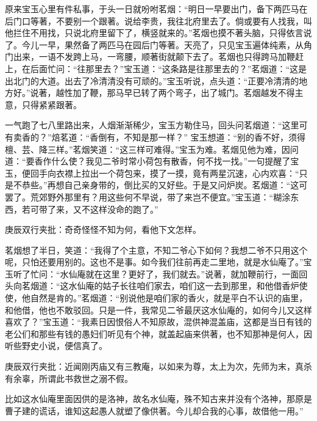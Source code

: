 \begin{parag}
    原来宝玉心里有件私事，于头一日就吩咐茗烟：“明日一早要出门，备下两匹马在后门口等著，不要别一个跟著。说给李贵，我往北府里去了。倘或要有人找我，叫他拦住不用找，只说北府里留下了，横竖就来的。”茗烟也摸不著头脑，只得依言说了。今儿一早，果然备了两匹马在园后门等著。天亮了，只见宝玉遍体纯素，从角门出来，一语不发跨上马，一弯腰，顺著街就颠下去了。茗烟也只得跨马加鞭赶上，在后面忙问：“往那里去？”宝玉道：“这条路是往那里去的？”茗烟道：“这是出北门的大道。出去了冷清清没有可顽的。”宝玉听说，点头道：“正要冷清清的地方好。”说著，越性加了鞭，那马早已转了两个弯子，出了城门。茗烟越发不得主意，只得紧紧跟著。
\end{parag}


\begin{parag}
    一气跑了七八里路出来，人烟渐渐稀少，宝玉方勒住马，回头问茗烟道：“这里可有卖香的？”焙茗道：“香倒有，不知是那一样？” 宝玉想道：“别的香不好，须得檀、芸、降三样。”茗烟笑道：“这三样可难得。”宝玉为难。茗烟见他为难，因问道：“要香作什么使？我见二爷时常小荷包有散香，何不找一找。”一句提醒了宝玉，便回手向衣襟上拉出一个荷包来，摸了一摸，竟有两星沉速，心内欢喜：“只是不恭些。”再想自己亲身带的，倒比买的又好些。于是又问炉炭。茗烟道：“这可罢了。荒郊野外那里有？用这些何不早说，带了来岂不便宜。”宝玉道：“糊涂东西，若可带了来，又不这样没命的跑了。”\begin{note}庚辰双行夹批：奇奇怪怪不知为何，看他下文怎样。\end{note}茗烟想了半日，笑道：“我得了个主意，不知二爷心下如何？我想二爷不只用这个呢，只怕还要用别的。这也不是事。如今我们往前再走二里地，就是水仙庵了。”宝玉听了忙问：“水仙庵就在这里？更好了，我们就去。”说著，就加鞭前行，一面回头向茗烟道：“这水仙庵的姑子长往咱们家去，咱们这一去到那里，和他借香炉使使，他自然是肯的。”茗烟道：“别说他是咱们家的香火，就是平白不认识的庙里，和他借，他也不敢驳回。只是一件，我常见二爷最厌这水仙庵的，如何今儿又这样喜欢了？”宝玉道：“我素日因恨俗人不知原故，混供神混盖庙，这都是当日有钱的老公们和那些有钱的愚妇们听见有个神，就盖起庙来供著，也不知那神是何人，因听些野史小说，便信真了。\begin{note}庚辰双行夹批：近闻刚丙庙又有三教庵，以如来为尊，太上为次，先师为末，真杀有余辜，所谓此书救世之溺不假。\end{note}比如这水仙庵里面因供的是洛神，故名水仙庵，殊不知古来并没有个洛神，那原是曹子建的谎话，谁知这起愚人就塑了像供著。今儿却合我的心事，故借他一用。”
\end{parag}


